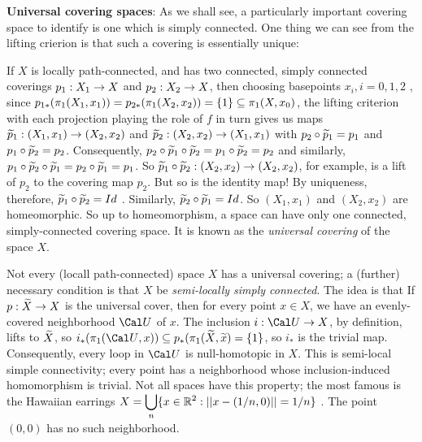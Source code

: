 \bsk

{\bf Universal covering spaces}: As we shall see, a particularly
important covering space to identify is one which is simply
connected. One thing we can see from the lifting crierion is
that such a covering is essentially unique:

\msk

If $X$ is locally path-connected, and has two connected, simply connected
coverings $p_1:X_1\rightarrow X$ and $p_2:X_2\rightarrow X$, then choosing
basepoints $x_i, i=0,1,2$ , since 
$p_{1*}(\pi_1(X_1,x_1)) = p_{2*}(\pi_1(X_2,x_2))=\{1\}\subseteq \pi_1(X,x_0)$,
the lifting criterion with each projection playing the role of $f$ in turn
gives us maps $\widetilde{p}_1:(X_1,x_1)\rightarrow (X_2,x_2)$ and 
$\widetilde{p}_2:(X_2,x_2)\rightarrow (X_1,x_1)$ with $p_2\circ\widetilde{p}_1=p_1$
and $p_1\circ\widetilde{p}_2=p_2$. Consequently, 
$p_2\circ\widetilde{p}_1\circ \widetilde{p}_2 = p_1\circ\widetilde{p}_2=p_2$
and similarly, 
$p_1\circ\widetilde{p}_2\circ \widetilde{p}_1 =p_2\circ\widetilde{p}_1=p_1$.
So $\widetilde{p}_1\circ \widetilde{p}_2:(X_2,x_2)\rightarrow (X_2,x_2)$, for example,
is a lift of $p_2$ to the covering map $p_2$. But so is the identity map! By
uniqueness, therefore, $\widetilde{p}_1\circ \widetilde{p}_2=Id$ . Similarly,
$\widetilde{p}_2\circ \widetilde{p}_1=Id$. So $(X_1,x_1)$ and $(X_2,x_2)$ 
are homeomorphic. So up to homeomorphism, a space can have
only one connected, simply-connected covering space. It is known
as the {\it universal covering} of the space $X$. 

\msk

Not every (locall path-connected) space $X$ has a universal covering; a 
(further) necessary condition is that $X$ be {\it semi-locally simply connected}.
The idea is that If $p:\widetilde{X}\rightarrow X$ is the universal cover, then for every 
point $x\in X$, we have an evenly-covered neighborhood ${\Cal U}$ of $x$.
The inclusion $i:{\Cal U}\ra X$, by definition, lifts to $\widetilde{X}$, so
$i_*(\pu({\Cal U},x))\sset p_*(\pu(\wtl{X},\wtl{x}) = \{1\}$, so
$i_*$ is the trivial map. Consequently, every loop in ${\Cal U}$ is 
null-homotopic in $X$. This is semi-local simple connectivity;
every point has a neighborhood whose inclusion-induced homomorphism
is trivial. Not all spaces have this property; the most famous is the 
Hawaiian earrings 
$\displaystyle X=\bigcup_{n}\{x\in {\Bbb R}^2 :  ||x-(1/n,0)||=1/n\}$ .
The point $(0,0)$ has no such neighborhood. 

\msk

